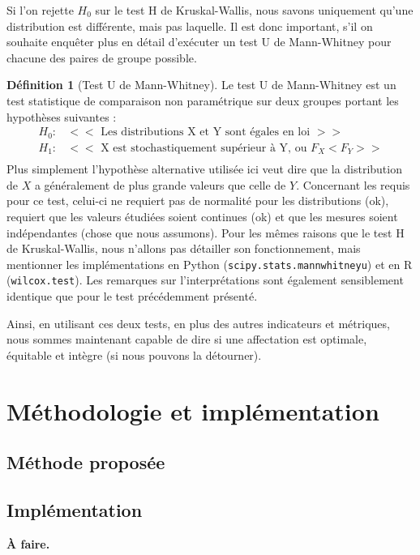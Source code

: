 \documentclass{rapport}
\theoremstyle{definition}
\newtheorem{definition}{Définition}
\theoremstyle{remark}
\theoremstyle{plain}
\theoremstyle{definition}
\theoremstyle{remark}
\begin{document}
Si l'on rejette $H_0$ sur le test H de Kruskal-Wallis, nous savons uniquement qu'une distribution est différente, mais pas laquelle. Il est donc important, s'il on souhaite enquêter plus en détail d'exécuter un test U de Mann-Whitney pour chacune des paires de groupe possible.
\begin{definition}[Test U de Mann-Whitney]
    Le test U de Mann-Whitney est un test statistique de comparaison non paramétrique sur deux groupes portant les hypothèses suivantes :
    $$
    \begin{matrix}
        H_0 : & << \text{ Les distributions X et Y sont égales en loi } >>\\
        H_1 : & << \text{ X est stochastiquement supérieur à Y, ou } F_X<F_Y >>\\
    \end{matrix}
    $$
    Plus simplement l'hypothèse alternative utilisée ici veut dire que la distribution de $X$ a généralement de plus grande valeurs que celle de $Y$.
    Concernant les requis pour ce test, celui-ci ne requiert pas de normalité pour les distributions (ok), requiert que les valeurs étudiées soient continues (ok) et que les mesures soient indépendantes (chose que nous assumons).
    Pour les mêmes raisons que le test H de Kruskal-Wallis, nous n'allons pas détailler son fonctionnement, mais mentionner les implémentations en Python (\texttt{scipy.stats.mannwhitneyu}) et en R (\texttt{wilcox.test}).
    Les remarques sur l'interprétations sont également sensiblement identique que pour le test précédemment présenté.
\end{definition}

Ainsi, en utilisant ces deux tests, en plus des autres indicateurs et métriques, nous sommes maintenant capable de dire si une affectation est optimale, équitable et intègre (si nous pouvons la détourner).

\section{Méthodologie et implémentation}
\subsection{Méthode proposée}




\subsection{Implémentation}
\textbf{À faire.}
\end{document}
